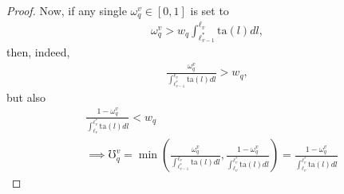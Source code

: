 \documentclass[hidelinks, nonatbib]{elsarticle}
\begin{document}
\begin{lemma}
\begin{proof}
        Now, if any single $\omega_{q}^{v} \in [0,1]$ is set to
        \begin{gather}
            \omega_{q}^{v} > 
            w_q
            \int_{
                \ell_{v-1}^{*}
            }^{
                \ell_{v}
            }{
                \text{ta}(l)
                dl
            }
            ,
        \end{gather}
        then, indeed,
        \begin{gather}
            \frac{
                \omega_{q}^{v}
            }{
                \int_{
                    \ell_{v-1}^{*}
                }^{
                    \ell_{v}
                }{
                    \text{ta}(l)dl
                }
            }
            >
            w_q
            ,
        \end{gather}
        but also
        \begin{align}
            &
            \frac{
                1 - \omega_{q}^{v}
            }{
                \int_{
                    \ell_{v}
                }^{
                    \ell_{v}^{*}
                }{
                    \text{ta}(l)dl
                }
            }
            <
            w_q
            \\
            &\implies
            \mho_{q}^{v} = 
            \min\left(
                \frac{
                    \omega_{q}^{v}
                }{
                    \int_{
                        \ell_{v-1}^{*}
                    }^{
                        \ell_{v}
                    }
                    \text{ta}(l)dl
                }
                ,
                \frac{
                    1-\omega_{q}^{v}
                }{
                    \int_{
                        \ell_{v}
                    }^{
                        \ell_{v}^{*}
                    }
                    \text{ta}(l)dl
                }
            \right)
            =
            \frac{
                1 - \omega_{q}^{v}
            }{
                \int_{
                    \ell_{v}
                }^{
                    \ell_{v}^{*}
                }{
                    \text{ta}(l)dl
}}
\end{align}
\end{proof}
\end{lemma}
\end{document}
